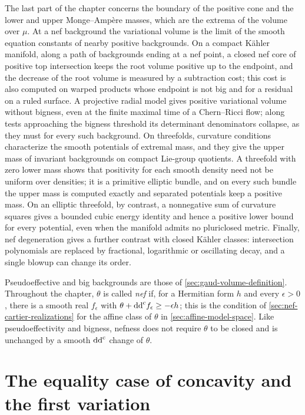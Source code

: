 The last part of the chapter concerns the boundary of the positive cone and the lower and upper Monge--Amp\`ere masses, which are the extrema of the volume over $\mu$. At a nef background the variational volume is the limit of the smooth equation constants of nearby positive backgrounds. On a compact K\"ahler manifold, along a path of backgrounds ending at a nef point, a closed nef core of positive top intersection keeps the root volume positive up to the endpoint, and the decrease of the root volume is measured by a subtraction cost; this cost is also computed on warped products whose endpoint is not big and for a residual on a ruled surface. A projective radial model gives positive variational volume without bigness, even at the finite maximal time of a Chern--Ricci flow; along tests approaching the bigness threshold its determinant denominators collapse, as they must for every such background. On threefolds, curvature conditions characterize the smooth potentials of extremal mass, and they give the upper mass of invariant backgrounds on compact Lie-group quotients. A threefold with zero lower mass shows that positivity for each smooth density need not be uniform over densities; it is a primitive elliptic bundle, and on every such bundle the upper mass is computed exactly and separated potentials keep a positive mass. On an elliptic threefold, by contrast, a nonnegative sum of curvature squares gives a bounded cubic energy identity and hence a positive lower bound for every potential, even when the manifold admits no pluriclosed metric. Finally, nef degeneration gives a further contrast with closed K\"ahler classes: intersection polynomials are replaced by fractional, logarithmic or oscillating decay, and a single blowup can change its order.

Pseudoeffective and big backgrounds are those of \cref{sec:gaud-volume-definition}. Throughout the chapter, $\theta$ is called \emph{nef} if, for a Hermitian form $h$ and every $\epsilon>0$, there is a smooth real $f_\epsilon$ with $\theta+\mathrm{dd}^{\mathrm{c}} f_\epsilon\geq-\epsilon h$; this is the condition of \cref{sec:nef-cartier-realizations} for the affine class of $\theta$ in \cref{sec:affine-model-space}. Like pseudoeffectivity and bigness, nefness does not require $\theta$ to be closed and is unchanged by a smooth $\mathrm{dd}^{\mathrm{c}}$ change of $\theta$.

\section{The equality case of concavity and the first variation}

